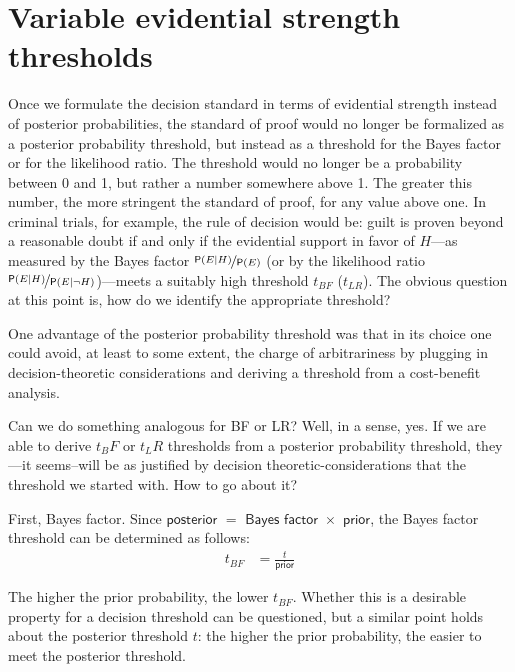 \documentclass[
  10pt,
  dvipsnames,enabledeprecatedfontcommands]{scrartcl}
\newcommand{\n}{\neg}
\newcommand{\pr}[1]{\mathsf{P}(#1)}
\begin{document}
\hypertarget{variable-evidential-strength-thresholds}{%
\section{Variable evidential strength
thresholds}\label{variable-evidential-strength-thresholds}}

Once we formulate the decision standard in terms of evidential strength
instead of posterior probabilities, the standard of proof would no
longer be formalized as a posterior probability threshold, but instead
as a threshold for the Bayes factor or for the likelihood ratio. The
threshold would no longer be a probability between 0 and 1, but rather a
number somewhere above 1. The greater this number, the more stringent
the standard of proof, for any value above one. In criminal trials, for
example, the rule of decision would be: guilt is proven beyond a
reasonable doubt if and only if the evidential support in favor of
\(H\)---as measured by the Bayes factor
\(\nicefrac{\pr{E \vert H}}{\pr{E}}\) (or by the likelihood ratio
\(\nicefrac{\pr{E\vert H}}{\pr{E \vert \n H}}\))---meets a suitably high
threshold \(t_{BF}\) (\(t_{LR}\)). The obvious question at this point
is, how do we identify the appropriate
threshold?

One advantage of the posterior probability threshold was that in its
choice one could avoid, at least to some extent, the charge of
arbitrariness by plugging in decision-theoretic considerations and
deriving a threshold from a cost-benefit analysis.

Can we do something analogous for BF or LR? Well, in a sense, yes. If we
are able to derive \(t_BF\) or \(t_LR\) thresholds from a posterior
probability threshold, they---it seems--will be as justified by decision
theoretic-considerations that the threshold we started with. How to go
about it?

First, Bayes factor.
 Since
\(\textsf{posterior }=\textsf{ Bayes factor }\times \textsf{ prior}\),
the Bayes factor threshold can be determined as follows:
\begin{align*}t_{BF} & = \frac{t}{\textsf{prior}}
\end{align*}

\noindent The higher the prior probability, the lower \(t_{BF}\).
Whether this is a desirable property for a decision threshold can be
questioned, but a similar point holds about the posterior threshold
\(t\): the higher the prior probability, the easier to meet the
posterior threshold.
\end{document}
